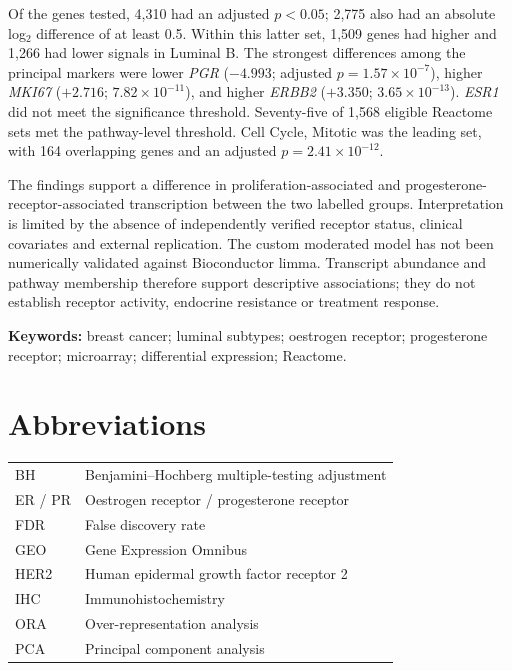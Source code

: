 \documentclass[11pt,a4paper]{article}
\newcommand{\gene}[1]{\textit{#1}}
\begin{document}
Of the genes tested, 4,310 had an adjusted $p<0.05$; 2,775 also had an absolute log$_2$ difference of at least 0.5. Within this latter set, 1,509 genes had higher and 1,266 had lower signals in Luminal B. The strongest differences among the principal markers were lower \gene{PGR} ($-4.993$; adjusted $p=1.57\times10^{-7}$), higher \gene{MKI67} ($+2.716$; $7.82\times10^{-11}$), and higher \gene{ERBB2} ($+3.350$; $3.65\times10^{-13}$). \gene{ESR1} did not meet the significance threshold. Seventy-five of 1,568 eligible Reactome sets met the pathway-level threshold. Cell Cycle, Mitotic was the leading set, with 164 overlapping genes and an adjusted $p=2.41\times10^{-12}$.

The findings support a difference in proliferation-associated and progesterone-receptor-associated transcription between the two labelled groups. Interpretation is limited by the absence of independently verified receptor status, clinical covariates and external replication. The custom moderated model has not been numerically validated against Bioconductor limma. Transcript abundance and pathway membership therefore support descriptive associations; they do not establish receptor activity, endocrine resistance or treatment response.

\vspace{5mm}
\noindent\textbf{Keywords:} breast cancer; luminal subtypes; oestrogen receptor; progesterone receptor; microarray; differential expression; Reactome.

\section*{Abbreviations}
\begin{tabularx}{\linewidth}{@{}lX@{}}
BH & Benjamini--Hochberg multiple-testing adjustment\\
ER / PR & Oestrogen receptor / progesterone receptor\\
FDR & False discovery rate\\
GEO & Gene Expression Omnibus\\
HER2 & Human epidermal growth factor receptor 2\\
IHC & Immunohistochemistry\\
ORA & Over-representation analysis\\
PCA & Principal component analysis
\end{tabularx}
\clearpage
\begingroup
\small\linespread{1.0}\selectfont
\tableofcontents
\endgroup
\clearpage
{}
\end{document}
